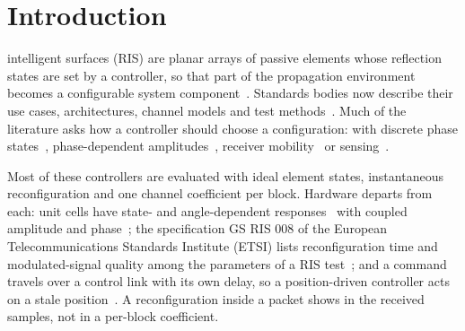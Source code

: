 \section{Introduction}\label{sec:intro}

 intelligent surfaces (RIS) are planar arrays of passive
elements whose reflection states are set by a controller, so that part of the propagation
environment becomes a configurable system component~\cite{DiRenzo2020SRE,Basar2019Access,WuZhang2020IRS}.
Standards bodies now describe their use cases, architectures, channel models and test
methods~\cite{ETSI_GR_RIS001_v121,ETSI_GR_RIS002_v121,ETSI_GR_RIS003_v121,ETSI_GS_RIS008}.
Much of the literature asks how a controller should choose a configuration: with discrete
phase states~\cite{WuZhang2020Discrete,Zhang2022OptimalBinary,Zhao2024OptimalDiscrete},
phase-dependent amplitudes~\cite{Abeywickrama2020Practical}, receiver
mobility~\cite{Matthiesen2021Mobility,Mishra2025WCL} or sensing~\cite{Mishra2025NCC}.



Most of these controllers are evaluated with ideal element states, instantaneous
reconfiguration and one channel coefficient per block. Hardware departs from each: unit cells
have state- and angle-dependent responses~\cite{Tang2021PathLoss,Tang2022mmWave} with coupled
amplitude and phase~\cite{Abeywickrama2020Practical}; the specification GS RIS 008 of the
European Telecommunications Standards Institute (ETSI) lists reconfiguration time and
modulated-signal quality among the parameters of a RIS test~\cite{ETSI_GS_RIS008}; and a command travels over a control link with its own delay, so a position-driven controller
acts on a stale position~\cite{Mishra2025WCL}. A reconfiguration inside a packet shows in the
received samples, not in a per-block coefficient.

